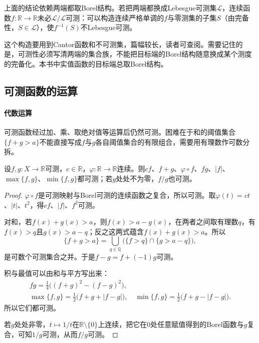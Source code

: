 上面的结论依赖两端都取Borel结构。若把两端都换成Lebesgue可测集$\mathcal L$，连续函数$f:\mathbb R\to\mathbb R$未必$\mathcal L/\mathcal L$可测：可以构造连续严格单调的$f$与零测集的子集$S$（由完备性，$S\in\mathcal L$），使$f^{-1}(S)$不Lebesgue可测。

这个构造要用到Cantor函数和不可测集，篇幅较长，读者可查阅。需要记住的是，可测性必须写清两端的集合族，不能把目标端的Borel结构随意换成某个测度的完备化。本书中实值函数的目标端总取Borel结构。

\subsection{可测函数的运算}
\label{sec:meas-function-operations}

\paragraph{代数运算}
可测函数经过加、乘、取绝对值等运算后仍然可测。困难在于和的阈值集合$\{f+g>a\}$不能直接写成$f$与$g$各自阈值集合的有限组合，需要用有理数作可数分拆。

\begin{theorem}[可测函数的运算]
\label{thm:meas-function-operations}
设$f,g:X\to\mathbb R$可测，$c\in\mathbb R$，$\varphi:\mathbb R\to\mathbb R$连续。则$cf$、$f+g$、$\varphi\circ f$、$fg$、$\lvert f\rvert$、$\max\{f,g\}$、$\min\{f,g\}$都可测；若$g$处处不为零，$f/g$也可测。
\end{theorem}

\begin{proof}
$\varphi\circ f$是可测映射与Borel可测的连续函数之复合，所以可测。取$\varphi(t)=ct$、$\lvert t\rvert$、$t^2$，得$cf$、$\lvert f\rvert$、$f^2$可测。

对和，若$f(x)+g(x)>a$，则$f(x)>a-g(x)$，在两者之间取有理数$q$，有$f(x)>q$且$g(x)>a-q$；反之这两式蕴含$f(x)+g(x)>a$。所以
\begin{equation}
 \{f+g>a\}=\bigcup_{q\in\mathbb Q}\bigl(\{f>q\}\cap\{g>a-q\}\bigr),
 \label{eq:meas-sum-threshold}
\end{equation}
是可数个可测集合之并。于是$f-g=f+(-1)g$可测。

积与最值可以由和与平方写出来：
\[
\begin{gathered}
 fg=\tfrac14\bigl((f+g)^2-(f-g)^2\bigr),\\
 \max\{f,g\}=\tfrac12\bigl(f+g+\lvert f-g\rvert\bigr),\quad
 \min\{f,g\}=\tfrac12\bigl(f+g-\lvert f-g\rvert\bigr).
\end{gathered}
\]
所以它们都可测。

若$g$处处非零，$t\mapsto1/t$在$\mathbb R\setminus\{0\}$上连续，把它在$0$处任意赋值得到的Borel函数与$g$复合，可知$1/g$可测，从而$f/g$可测。
\end{proof}

